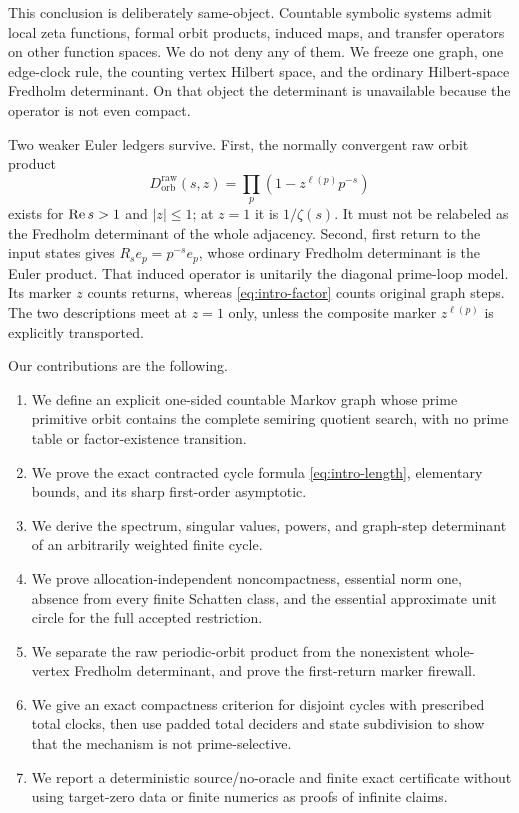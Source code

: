 This conclusion is deliberately same-object.  Countable symbolic systems
admit local zeta functions, formal orbit products, induced maps, and transfer
operators on other function spaces.  We do not deny any of them.  We freeze
one graph, one edge-clock rule, the counting vertex Hilbert space, and the
ordinary Hilbert-space Fredholm determinant.  On that object the determinant
is unavailable because the operator is not even compact.

Two weaker Euler ledgers survive.  First, the normally convergent raw orbit
product
\[
D^{\mathrm{raw}}_{\mathrm{orb}}(s,z)
=\prod_p(1-z^{\ell(p)}p^{-s})
\]
exists for $\operatorname{Re} s>1$ and $|z|\le1$; at $z=1$ it is
$1/\zeta(s)$.  It must not be relabeled as the Fredholm determinant of the
whole adjacency.  Second, first return to the input states gives
$R_s e_p=p^{-s}e_p$, whose ordinary Fredholm determinant is the Euler
product.  That induced operator is unitarily the diagonal prime-loop model.
Its marker $z$ counts returns, whereas \eqref{eq:intro-factor} counts original
graph steps.  The two descriptions meet at $z=1$ only, unless the composite
marker $z^{\ell(p)}$ is explicitly transported.

Our contributions are the following.

\begin{enumerate}
\item We define an explicit one-sided countable Markov graph whose prime
  primitive orbit contains the complete semiring quotient search, with no
  prime table or factor-existence transition.
\item We prove the exact contracted cycle formula \eqref{eq:intro-length},
  elementary bounds, and its sharp first-order asymptotic.
\item We derive the spectrum, singular values, powers, and graph-step
  determinant of an arbitrarily weighted finite cycle.
\item We prove allocation-independent noncompactness, essential norm one,
  absence from every finite Schatten class, and the essential approximate
  unit circle for the full accepted restriction.
\item We separate the raw periodic-orbit product from the nonexistent
  whole-vertex Fredholm determinant, and prove the first-return marker
  firewall.
\item We give an exact compactness criterion for disjoint cycles with
  prescribed total clocks, then use padded total deciders and state
  subdivision to show that the mechanism is not prime-selective.
\item We report a deterministic source/no-oracle and finite exact certificate
  without using target-zero data or finite numerics as proofs of infinite
  claims.
\end{enumerate}

